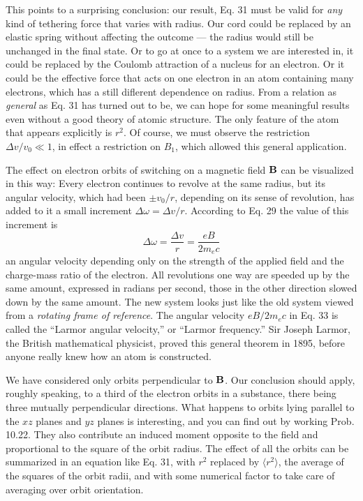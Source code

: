 This points to a surprising conclusion: our result, Eq. 31 must be
valid for \emph{any} kind of tethering force that varies with radius. Our
cord could be replaced by an elastic spring without affecting the
outcome --- the radius would still be unchanged in the final state.
Or to go at once to a system we are interested in, it could be replaced
by the Coulomb attraction of a nucleus for an electron. Or it could
be the effective force that acts on one electron in an atom containing
many electrons, which has a still diflerent dependence on radius.
From a relation as \emph{general} as Eq. 31 has turned out to be, we can hope
for some meaningful results even without a good theory of atomic
structure. The only feature of the atom that appears explicitly is $r^2$.
Of course, we must observe the restriction $\Delta v/v_0 \ll 1$, in effect a
restriction on $B_1$, which allowed this general application.

The effect on electron orbits of switching on a magnetic field $\mathbf{B}$ can
be visualized in this way: Every electron continues to revolve at the
same radius, but its angular velocity, which had been $\pm v_0/r$, depending
on its sense of revolution, has added to it a small increment
$\Delta\omega=\Delta v/r$. According to Eq. 29 the value of this increment is
\begin{equation}
  \Delta\omega = \frac{\Delta v}{r} = \frac{eB}{2m_ec}
\end{equation}
an angular velocity depending only on the strength of the applied
field and the charge-mass ratio of the electron. All revolutions one
way are speeded up by the same amount, expressed in radians per
second, those in the other direction slowed down by the same
amount. The new system looks just like the old system viewed from
a \emph{rotating frame of reference}. The angular velocity $eB/2m_ec$ in Eq. 33
is called the ``Larmor angular velocity,'' or ``Larmor frequency.''
Sir Joseph Larmor, the British mathematical physicist, proved this
general theorem in 1895, before anyone really knew how an atom
is constructed.

We have considered only orbits perpendicular to $\mathbf{B}$. Our conclusion
should apply, roughly speaking, to a third of the electron
orbits in a substance, there being three mutually perpendicular
directions. What happens to orbits lying parallel to the $xz$ planes
and $yz$ planes is interesting, and you can find out by working
Prob. 10.22. They also contribute an induced moment opposite to
the field and proportional to the square of the orbit radius. The
effect of all the orbits can be summarized in an equation like Eq. 31,
with $r^2$ replaced by $\langle r^2 \rangle$, the average of the squares of the orbit radii,
and with some numerical factor to take care of averaging over orbit
orientation.

